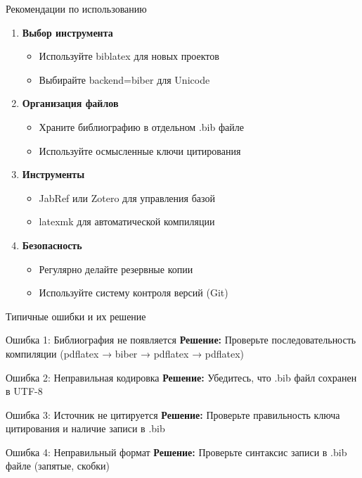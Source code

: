 \documentclass[aspectratio=169, 12pt]{beamer}
\begin{document}
\begin{frame}{Рекомендации по использованию}
  \begin{enumerate}
    \item \textbf{Выбор инструмента}
    \begin{itemize}
      \item Используйте biblatex для новых проектов
      \item Выбирайте backend=biber для Unicode
    \end{itemize}
    
    \item \textbf{Организация файлов}
    \begin{itemize}
      \item Храните библиографию в отдельном .bib файле
      \item Используйте осмысленные ключи цитирования
    \end{itemize}
    
    \item \textbf{Инструменты}
    \begin{itemize}
      \item JabRef или Zotero для управления базой
      \item latexmk для автоматической компиляции
    \end{itemize}
    
    \item \textbf{Безопасность}
    \begin{itemize}
      \item Регулярно делайте резервные копии
      \item Используйте систему контроля версий (Git)
    \end{itemize}
  \end{enumerate}
\end{frame}

\begin{frame}{Типичные ошибки и их решение}
  \begin{alertblock}{Ошибка 1: Библиография не появляется}
    \textbf{Решение:} Проверьте последовательность компиляции (pdflatex → biber → pdflatex → pdflatex)
  \end{alertblock}
  
  \begin{alertblock}{Ошибка 2: Неправильная кодировка}
    \textbf{Решение:} Убедитесь, что .bib файл сохранен в UTF-8
  \end{alertblock}
  
  \begin{alertblock}{Ошибка 3: Источник не цитируется}
    \textbf{Решение:} Проверьте правильность ключа цитирования и наличие записи в .bib
  \end{alertblock}
  
  \begin{alertblock}{Ошибка 4: Неправильный формат}
    \textbf{Решение:} Проверьте синтаксис записи в .bib файле (запятые, скобки)
  \end{alertblock}
\end{frame}
\end{document}
